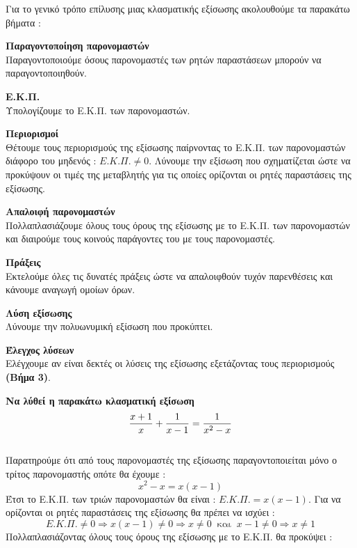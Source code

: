 \documentclass[twoside,nofonts,internet,methodoi]{thewria}
\DeclareRobustCommand{\frac}[3][0pt]{%
{\begingroup\hspace{#1}#2\hspace{#1}\endgroup\over\hspace{#1}#3\hspace{#1}}}
\begin{document}
\begin{Methodos}
Για το γενικό τρόπο επίλυσης μιας κλασματικής εξίσωσης ακολουθούμε τα παρακάτω βήματα :
\begin{bhma}
\item \textbf{Παραγοντοποίηση παρονομαστών}\\
Παραγοντοποιούμε όσους παρονομαστές των ρητών παραστάσεων μπορούν να παραγοντοποιηθούν.
\item \textbf{Ε.Κ.Π.}\\
Υπολογίζουμε το Ε.Κ.Π. των παρονομαστών.
\item \textbf{Περιορισμοί}\\
Θέτουμε τους περιορισμούς της εξίσωσης παίρνοντας το Ε.Κ.Π. των παρονομαστών διάφορο του μηδενός : $ E.K.\varPi.\neq0 $. Λύνουμε την εξίσωση που σχηματίζεται ώστε να προκύψουν οι τιμές της μεταβλητής για τις οποίες ορίζονται οι ρητές παραστάσεις της εξίσωσης.
\item \textbf{Απαλοιφή παρονομαστών}\\
Πολλαπλασιάζουμε όλους τους όρους της εξίσωσης με το Ε.Κ.Π. των παρονομαστών και διαιρούμε τους κοινούς παράγοντες του με τους παρονομαστές.
\item \textbf{Πράξεις}\\
Εκτελούμε όλες τις δυνατές πράξεις ώστε να απαλοιφθούν τυχόν παρενθέσεις και κάνουμε αναγωγή ομοίων όρων.
\item \textbf{Λύση εξίσωσης}\\
Λύνουμε την πολυωνυμική εξίσωση που προκύπτει.
\item \textbf{Έλεγχος λύσεων}\\
Ελέγχουμε αν είναι δεκτές οι λύσεις της εξίσωσης εξετάζοντας τους περιορισμούς \textbf{(Βήμα 3)}.
\end{bhma}
\end{Methodos}
\textbf{Να λύθεί η παρακάτω κλασματική εξίσωση}
{\boldmath\[ \frac{x+1}{x}+\frac{1}{x-1}=\frac{1}{x^2-x} \]}
\lysh\\
Παρατηρούμε ότι από τους παρονομαστές της εξίσωσης παραγοντοποιείται μόνο ο τρίτος παρονομαστής οπότε θα έχουμε :
\[ x^2-x=x(x-1) \]
Έτσι το Ε.Κ.Π. των τριών παρονομαστών θα είναι : $ E.K.\varPi.=x(x-1) $. Για να ορίζονται οι ρητές παραστάσεις της εξίσωσης θα πρέπει να ισχύει :
\[ E.K.\varPi.\neq0\Rightarrow x(x-1)\neq0\Rightarrow x\neq0\ \textrm{ και }\ x-1\neq0\Rightarrow x\neq1 \]
Πολλαπλασιάζοντας όλους τους όρους της εξίσωσης με το Ε.Κ.Π. θα προκύψει :
\end{document}
